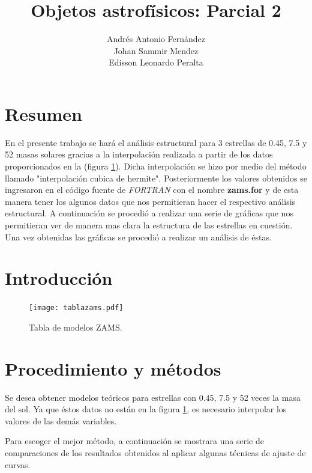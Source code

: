\documentclass[12pt]{article}
\begin{document}
\renewcommand{\listtablename}{Índice de tablas} 
\renewcommand{\tablename}{Tabla} 


\title{Objetos astrofísicos: Parcial 2}
\author{
Andrés Antonio Fernández \\
Johan Sammir Mendez \\
Edisson Leonardo Peralta
}
\maketitle

\section{Resumen}
En el presente trabajo se hará el análisis estructural para 3 estrellas de 0.45, 7.5 y 52 masas solares gracias a la interpolación realizada a partir de los datos proporcionados en la (figura \ref{fig:zams}). Dicha interpolación se hizo por medio del método llamado "interpolación cubica de hermite".
 Posteriormente los valores obtenidos se ingresaron en el código fuente de \textit{FORTRAN} con el nombre \textbf{zams.for} y de esta manera tener los algunos datos que nos permitieran hacer el respectivo análisis estructural. A continuación se procedió a realizar una serie de gráficas que nos permitieran ver de manera mas clara la estructura de las estrellas en cuestión. Una vez obtenidas las gráficas se procedió a realizar un análisis de éstas. 

\section{Introducción}


\begin{figure}[H]
    \centering   
    \texttt{[image: tablazams.pdf]}
    \caption{Tabla de modelos ZAMS.}
    \label{fig:zams}
\end{figure}


\section{Procedimiento y métodos}
Se desea obtener modelos teóricos para estrellas con 0.45, 7.5 y 52 veces la masa del sol. Ya que éstos datos no están en la figura \ref{fig:zams}, es necesario interpolar los valores de las demás variables.

Para escoger el mejor método, a continuación se mostrara una serie de comparaciones de los resultados obtenidos al aplicar algunas técnicas de ajuste de curvas.
\end{document}
